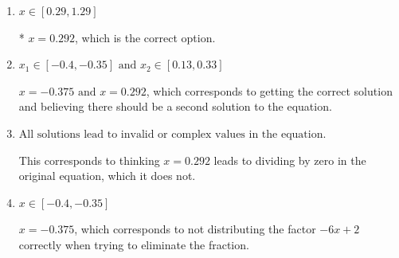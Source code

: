 \documentclass{extbook}[14pt]
\begin{document}
\begin{enumerate}
{\begin{enumerate}[label=\Alph*.]
$x = 0.292 \text{ and } x = 0.354$, which corresponds to getting the correct solution and believing there should be a second solution to the equation.
\item \( x \in [0.29,1.29] \)

* $x = 0.292$, which is the correct option.
\item \( x_1 \in [-0.4, -0.35] \text{ and } x_2 \in [0.13,0.33] \)

$x = -0.375 \text{ and } x = 0.292$, which corresponds to getting the correct solution and believing there should be a second solution to the equation.
\item \( \text{All solutions lead to invalid or complex values in the equation.} \)

This corresponds to thinking $x = 0.292$ leads to dividing by zero in the original equation, which it does not.
\item \( x \in [-0.4,-0.35] \)

$x = -0.375$, which corresponds to not distributing the factor $-6x + 2$ correctly when trying to eliminate the fraction.
\end{enumerate}

}
\end{enumerate}
\end{document}
